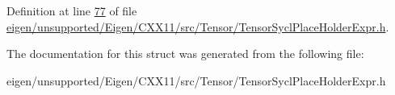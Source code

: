 Definition at line \hyperlink{eigen_2unsupported_2_eigen_2_c_x_x11_2src_2_tensor_2_tensor_sycl_place_holder_expr_8h_source_l00077}{77} of file \hyperlink{eigen_2unsupported_2_eigen_2_c_x_x11_2src_2_tensor_2_tensor_sycl_place_holder_expr_8h_source}{eigen/unsupported/\+Eigen/\+C\+X\+X11/src/\+Tensor/\+Tensor\+Sycl\+Place\+Holder\+Expr.\+h}.



The documentation for this struct was generated from the following file\+:\begin{DoxyCompactItemize}
\item 
eigen/unsupported/\+Eigen/\+C\+X\+X11/src/\+Tensor/\+Tensor\+Sycl\+Place\+Holder\+Expr.\+h\end{DoxyCompactItemize}
